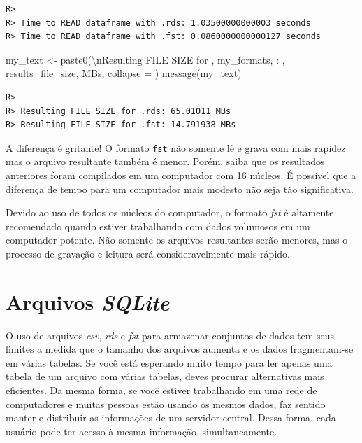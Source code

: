 \documentclass[
  11pt,
]{book}
\newenvironment{Shaded}{\begin{snugshade}}{\end{snugshade}}
\newcommand{\AttributeTok}[1]{\textcolor[rgb]{0.61,0.61,0.61}{#1}}
\newcommand{\FunctionTok}[1]{\textcolor[rgb]{0,0,0}{#1}}
\newcommand{\NormalTok}[1]{#1}
\newcommand{\OtherTok}[1]{\textcolor[rgb]{0.37,0.37,0.37}{#1}}
\newcommand{\SpecialCharTok}[1]{\textcolor[rgb]{0,0,0}{#1}}
\newcommand{\StringTok}[1]{\textcolor[rgb]{0.5,0.5,0.5}{#1}}
\newenvironment{rmdimportant}
{\begin{importantblock}

	} {\end{importantblock}}
\begin{document}
\begin{verbatim}
R> 
R> Time to READ dataframe with .rds: 1.03500000000003 seconds
R> Time to READ dataframe with .fst: 0.0860000000000127 seconds
\end{verbatim}

\begin{Shaded}
\begin{Highlighting}[]
\NormalTok{my\_text }\OtherTok{\textless{}{-}} \FunctionTok{paste0}\NormalTok{(}\StringTok{\textquotesingle{}}\SpecialCharTok{\textbackslash{}n}\StringTok{Resulting FILE SIZE for \textquotesingle{}}\NormalTok{,}
\NormalTok{                  my\_formats, }\StringTok{\textquotesingle{}: \textquotesingle{}}\NormalTok{,}
\NormalTok{                  results\_file\_size, }\StringTok{\textquotesingle{} MBs\textquotesingle{}}\NormalTok{, }\AttributeTok{collapse =} \StringTok{\textquotesingle{}\textquotesingle{}}\NormalTok{)}
\FunctionTok{message}\NormalTok{(my\_text)}
\end{Highlighting}
\end{Shaded}

\begin{verbatim}
R> 
R> Resulting FILE SIZE for .rds: 65.01011 MBs
R> Resulting FILE SIZE for .fst: 14.791938 MBs
\end{verbatim}

A diferença é gritante! O formato \texttt{fst} não somente lê e grava com mais rapidez mas o arquivo resultante também é menor. Porém, saiba que os resultados anteriores foram compilados em um computador com 16 núcleos. É possível que a diferença de tempo para um computador mais modesto não seja tão significativa.

\begin{rmdimportant}
Devido ao uso de todos os núcleos do computador, o formato \emph{fst} é
altamente recomendado quando estiver trabalhando com dados volumosos em
um computador potente. Não somente os arquivos resultantes serão
menores, mas o processo de gravação e leitura será consideravelmente
mais rápido.
\end{rmdimportant}

\hypertarget{arquivos-sqlite}{%
\section{\texorpdfstring{Arquivos \emph{SQLite}}{Arquivos SQLite}}\label{arquivos-sqlite}}

O uso de arquivos \emph{csv}, \emph{rds} e \emph{fst} para armazenar conjuntos de dados tem seus limites a medida que o tamanho dos arquivos aumenta e os dados fragmentam-se em várias tabelas. Se você está esperando muito tempo para ler apenas uma tabela de um arquivo com várias tabelas, deves procurar alternativas mais eficientes. Da mesma forma, se você estiver trabalhando em uma rede de computadores e muitas pessoas estão usando os mesmos dados, faz sentido manter e distribuir as informações de um servidor central. Dessa forma, cada usuário pode ter acesso à mesma informação, simultaneamente.
\end{document}
